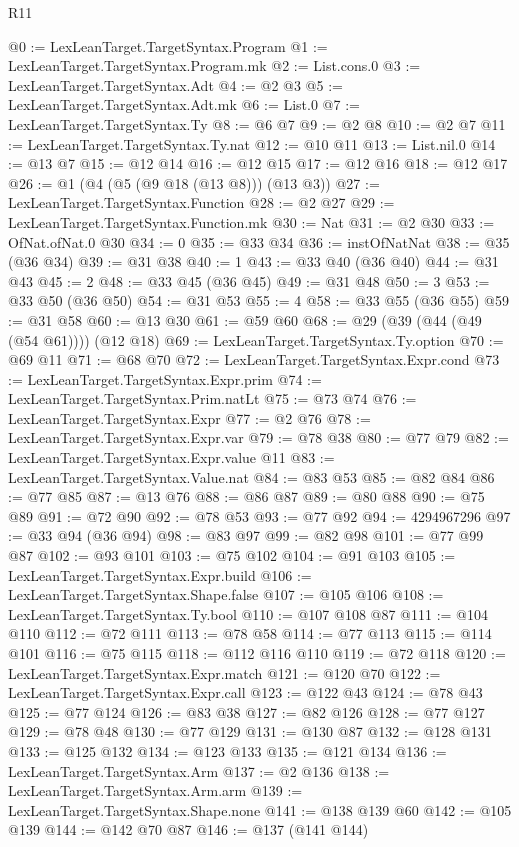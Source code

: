 \begin{lexlean}{R11}
\begin{coremodule}
@0 := LexLeanTarget.TargetSyntax.Program
@1 := LexLeanTarget.TargetSyntax.Program.mk
@2 := List.cons.{0}
@3 := LexLeanTarget.TargetSyntax.Adt
@4 := @2 @3
@5 := LexLeanTarget.TargetSyntax.Adt.mk
@6 := List.{0}
@7 := LexLeanTarget.TargetSyntax.Ty
@8 := @6 @7
@9 := @2 @8
@10 := @2 @7
@11 := LexLeanTarget.TargetSyntax.Ty.nat
@12 := @10 @11
@13 := List.nil.{0}
@14 := @13 @7
@15 := @12 @14
@16 := @12 @15
@17 := @12 @16
@18 := @12 @17
@26 := @1 (@4 (@5 (@9 @18 (@13 @8))) (@13 @3))
@27 := LexLeanTarget.TargetSyntax.Function
@28 := @2 @27
@29 := LexLeanTarget.TargetSyntax.Function.mk
@30 := Nat
@31 := @2 @30
@33 := OfNat.ofNat.{0} @30
@34 := 0
@35 := @33 @34
@36 := instOfNatNat
@38 := @35 (@36 @34)
@39 := @31 @38
@40 := 1
@43 := @33 @40 (@36 @40)
@44 := @31 @43
@45 := 2
@48 := @33 @45 (@36 @45)
@49 := @31 @48
@50 := 3
@53 := @33 @50 (@36 @50)
@54 := @31 @53
@55 := 4
@58 := @33 @55 (@36 @55)
@59 := @31 @58
@60 := @13 @30
@61 := @59 @60
@68 := @29 (@39 (@44 (@49 (@54 @61)))) (@12 @18)
@69 := LexLeanTarget.TargetSyntax.Ty.option
@70 := @69 @11
@71 := @68 @70
@72 := LexLeanTarget.TargetSyntax.Expr.cond
@73 := LexLeanTarget.TargetSyntax.Expr.prim
@74 := LexLeanTarget.TargetSyntax.Prim.natLt
@75 := @73 @74
@76 := LexLeanTarget.TargetSyntax.Expr
@77 := @2 @76
@78 := LexLeanTarget.TargetSyntax.Expr.var
@79 := @78 @38
@80 := @77 @79
@82 := LexLeanTarget.TargetSyntax.Expr.value @11
@83 := LexLeanTarget.TargetSyntax.Value.nat
@84 := @83 @53
@85 := @82 @84
@86 := @77 @85
@87 := @13 @76
@88 := @86 @87
@89 := @80 @88
@90 := @75 @89
@91 := @72 @90
@92 := @78 @53
@93 := @77 @92
@94 := 4294967296
@97 := @33 @94 (@36 @94)
@98 := @83 @97
@99 := @82 @98
@101 := @77 @99 @87
@102 := @93 @101
@103 := @75 @102
@104 := @91 @103
@105 := LexLeanTarget.TargetSyntax.Expr.build
@106 := LexLeanTarget.TargetSyntax.Shape.false
@107 := @105 @106
@108 := LexLeanTarget.TargetSyntax.Ty.bool
@110 := @107 @108 @87
@111 := @104 @110
@112 := @72 @111
@113 := @78 @58
@114 := @77 @113
@115 := @114 @101
@116 := @75 @115
@118 := @112 @116 @110
@119 := @72 @118
@120 := LexLeanTarget.TargetSyntax.Expr.match
@121 := @120 @70
@122 := LexLeanTarget.TargetSyntax.Expr.call
@123 := @122 @43
@124 := @78 @43
@125 := @77 @124
@126 := @83 @38
@127 := @82 @126
@128 := @77 @127
@129 := @78 @48
@130 := @77 @129
@131 := @130 @87
@132 := @128 @131
@133 := @125 @132
@134 := @123 @133
@135 := @121 @134
@136 := LexLeanTarget.TargetSyntax.Arm
@137 := @2 @136
@138 := LexLeanTarget.TargetSyntax.Arm.arm
@139 := LexLeanTarget.TargetSyntax.Shape.none
@141 := @138 @139 @60
@142 := @105 @139
@144 := @142 @70 @87
@146 := @137 (@141 @144)

\end{coremodule}
\end{lexlean}
